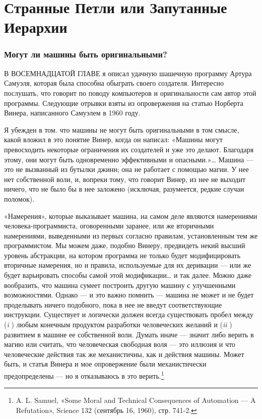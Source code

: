 \documentclass[../main.tex]{subfiles}
\begin{document}
\chapter{Странные Петли или Запутанные Иерархии}

\subsection{Могут ли машины быть оригинальными?}

В ВОСЕМНАДЦАТОЙ ГЛАВЕ я описал удачную шашечную программу Артура Самуэля, которая была способна обыграть своего создателя. Интересно послушать, что говорит по поводу компьютеров и оригинальности сам автор этой программы. Следующие отрывки взяты из опровержения на статью Норберта Винера, написанного Самуэлем в 1960 году.

Я убежден в том. что машины не могут быть оригинальными в том смысле, какой вложил в это понятие Винер, когда он написал: «Машины могут превосходить некоторые ограничения их создателей и уже это делают. Благодаря этому, они могут быть одновременно эффективными и опасными.»\ldots{} Машина --- это не вызванный из бутылки джинн; она не работает с помощью магии. У нее нет собственной воли, и, вопреки тому, что говорит Винер, из нее не выходит ничего, что не было бы в нее заложено (исключая, разумеется, редкие случаи поломок).

«Намерения», которые выказывает машина, на самом деле являются намерениями человека-программиста, оговоренными заранее, или же вторичными намерениями, выведенными из первых согласно правилам, установленным тем же программистом. Мы можем даже, подобно Винеру, предвидеть некий высший уровень абстракции, на котором программа не только будет модифицировать вторичные намерения, но и правила, используемые для их деривации --- или же будет варьировать способы самой этой модификации\ldots{} и так далее. Можно даже вообразить, что машина сумеет построить другую машину с улучшенными возможностями. Однако --- и это важно помнить --- машина не может и не будет проделывать ничего подобного, пока в нее не введут соответствующие инструкции. Существует и логически должен всегда существовать пробел между (\emph{i} ) любым конечным продуктом разработки человеческих желаний и (\emph{ii} ) развитием в машине ее собственной воли. Думать иначе --- значит либо верить в магию или считать, что человеческая свободная воля --- это иллюзия и что человеческие действия так же механистичны, как и действия машины. Может быть, и статья Винера и мое опровержение были механистически предопределены --- но я отказываюсь в это верить.\footnote{A. L. Samuel, «Some Moral and Technical Consequences of Automation --- A Refutation», Science 132 (сентябрь 16, 1960), стр. 741-2.}
\end{document}

